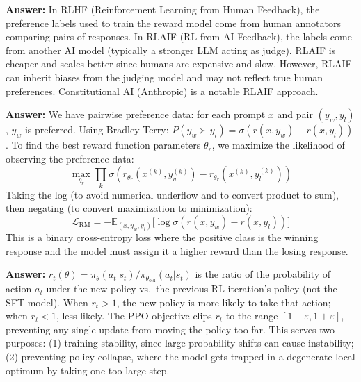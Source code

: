 \documentclass[11pt, a4paper]{article}
\begin{document}
\begin{notebox}
\textbf{Answer:} In RLHF (Reinforcement Learning from Human Feedback), the preference labels used to train the reward model come from human annotators comparing pairs of responses. In RLAIF (RL from AI Feedback), the labels come from another AI model (typically a stronger LLM acting as judge). RLAIF is cheaper and scales better since humans are expensive and slow. However, RLAIF can inherit biases from the judging model and may not reflect true human preferences. Constitutional AI (Anthropic) is a notable RLAIF approach.
\end{notebox}

\begin{notebox}
\textbf{Answer:} We have pairwise preference data: for each prompt $x$ and pair $(y_w, y_l)$, $y_w$ is preferred. Using Bradley-Terry: $P(y_w \succ y_l) = \sigma(r(x,y_w) - r(x,y_l))$. To find the best reward function parameters $\theta_r$, we maximize the likelihood of observing the preference data:
\[
\max_{\theta_r} \prod_k \sigma(r_{\theta_r}(x^{(k)},y_w^{(k)}) - r_{\theta_r}(x^{(k)},y_l^{(k)}))
\]
Taking the log (to avoid numerical underflow and to convert product to sum), then negating (to convert maximization to minimization):
\[
\mathcal{L}_{\text{RM}} = -\mathbb{E}_{(x,y_w,y_l)}\Big[\log \sigma(r(x,y_w) - r(x,y_l))\Big]
\]
This is a binary cross-entropy loss where the positive class is the winning response and the model must assign it a higher reward than the losing response.
\end{notebox}

\begin{notebox}
\textbf{Answer:} $r_t(\theta) = \pi_\theta(a_t|s_t) / \pi_{\theta_\text{old}}(a_t|s_t)$ is the ratio of the probability of action $a_t$ under the new policy vs.\ the previous RL iteration's policy (not the SFT model). When $r_t > 1$, the new policy is more likely to take that action; when $r_t < 1$, less likely. The PPO objective clips $r_t$ to the range $[1-\varepsilon, 1+\varepsilon]$, preventing any single update from moving the policy too far. This serves two purposes: (1) training stability, since large probability shifts can cause instability; (2) preventing policy collapse, where the model gets trapped in a degenerate local optimum by taking one too-large step.
\end{notebox}
\end{document}
